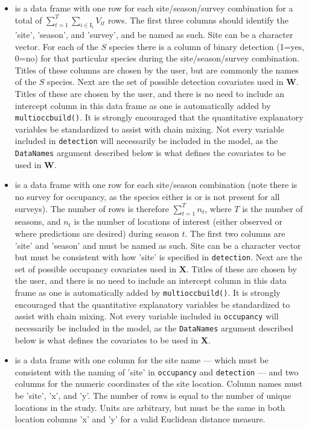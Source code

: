 \begin{itemize}
   
\item {} is a data frame with one row for each site/season/survey combination for a total of $\sum_{t=1}^T \sum_{i \in \mathrm{I}_t} V_{it}$ rows.  The first three columns should identify the 'site', 'season', and 'survey', and be named as such.  Site can be a character vector.  For each of the $S$ species there is a column of binary detection (1=yes, 0=no) for that particular species during the site/season/survey combination.  Titles of these columns are chosen by the user, but are commonly the names of the $S$ species.  Next are the set of possible detection covariates used in $\textbf{W}$.  Titles of these are chosen by the user, and there is no need to include an intercept column in this data frame as one is automatically added by \texttt{multioccbuild()}.  It is strongly encouraged that the quantitative explanatory variables be standardized to assist with chain mixing.  Not every variable included in \texttt{detection} will necessarily be included in the model, as the \texttt{DataNames} argument described below is what defines the covariates to be used in \textbf{W}.       
    
\item {} is a data frame with one row for each site/season combination (note there is no survey for occupancy, as the species either is or is not present for all surveys). The number of rows is therefore $\sum_{t=1}^T n_t$, where $T$ is the number of seasons, and $n_t$ is the number of locations of interest (either observed or where predictions are desired) during season $t$. The first two columns are 'site' and 'season' and must be named as such.  Site can be a character vector but must be consistent with how 'site' is specified in \texttt{detection}.  Next are the set of possible occupancy covariates used in $\textbf{X}$.  Titles of these are chosen by the user, and there is no need to include an intercept column in this data frame as one is automatically added by \texttt{multioccbuild()}.  It is strongly encouraged that the quantitative explanatory variables be standardized to assist with chain mixing.  Not every variable included in \texttt{occupancy} will necessarily be included in the model, as the \texttt{DataNames} argument described below is what defines the covariates to be used in \textbf{X}. 
    
\item {} is a data frame with one column for the site name --- which must be consistent with the naming of 'site' in \texttt{occupancy} and \texttt{detection} --- and two columns for the numeric coordinates of the site location.  Column names must be 'site', 'x', and 'y'.  The number of rows is equal to the number of unique locations in the study.  Units are arbitrary, but must be the same in both location columns 'x' and 'y' for a valid Euclidean distance measure.
    

\end{itemize}
